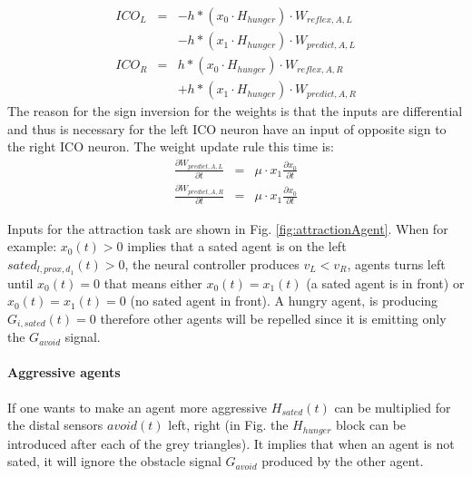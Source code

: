 \begin{eqnarray}
ICO_{L}&=&-h \ast ( x_0 \cdot H_{hunger}) \cdot W_{reflex,A,L} \\ \nonumber
       & &-h \ast ( x_1 \cdot H_{hunger}) \cdot W_{predict,A,L} \label{eq:ICO:L2}\\
ICO_{R}&=& h \ast ( x_0 \cdot H_{hunger}) \cdot W_{reflex,A,R} \\ \nonumber
       & &+h \ast ( x_1 \cdot H_{hunger}) \cdot W_{predict,A,R} \label{eq:ICO:R2}
\end{eqnarray}
The reason for the sign inversion for the weights is that the inputs
are differential and thus is necessary for the left ICO neuron have
an input of opposite sign to the right ICO neuron.
The weight update rule this time is:
\begin{eqnarray}
\frac{\partial W_{predict,A,L}}{\partial t}&=& \mu \cdot x_1 \frac{\partial x_0}{\partial t}\\
\frac{\partial W_{predict,A,R}}{\partial t}&=& \mu \cdot x_1 \frac{\partial x_0}{\partial t}
\end{eqnarray}

Inputs for the attraction task are shown in Fig. \ref{fig:attractionAgent}.
When for example:  $x_{0}(t)>0$ implies that a sated agent is on the left
$sated_{l,prox,d_{1}}(t)>0$, the neural controller produces $v_{L}<v_{R}$,
agents turns left until $x_{0}(t)=0$ that means either $x_{0}(t)=x_{1}(t)$
(a sated agent is in front) or $x_{0}(t)=x_{1}(t)=0$ (no sated agent in front).
A hungry agent, is producing $G_{i,sated}(t)=0$ therefore other agents will be
 repelled since it is emitting only the $G_{avoid}$ signal.

\paragraph{Aggressive agents}\label{eq:aggressive}
If one wants to make an agent more aggressive  $H_{sated}(t)$ can be multiplied for the
distal sensors $avoid(t)$ left, right (in Fig.\label{fig:avoid} the $H_{hunger}$
block can be introduced after each of the grey triangles). It implies that when
an agent is not sated, it will ignore the obstacle signal $G_{avoid}$
produced by the other agent.

